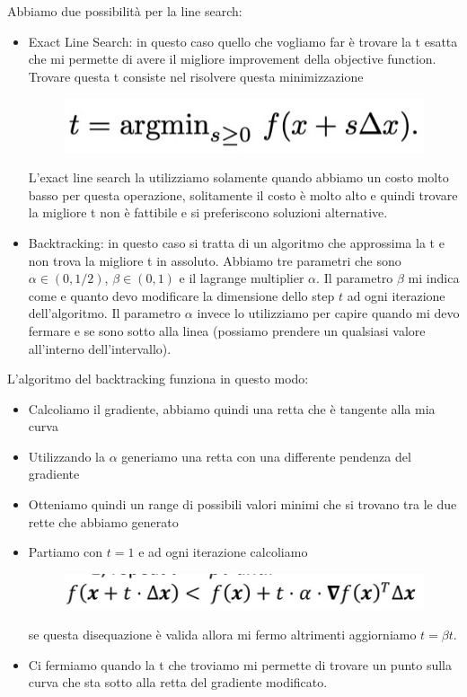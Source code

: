 \documentclass[14pt]{extreport}
\begin{document}
Abbiamo due possibilità per la line search:

\begin{itemize}
\item Exact Line Search: in questo caso quello che vogliamo far è trovare la t esatta che mi permette di avere il migliore improvement della objective
function. Trovare questa t consiste nel risolvere questa minimizzazione \begin{figure}[H]
\centering
\includegraphics[width=0.4\linewidth]{241.jpeg}
\end{figure}
L'exact line search la utilizziamo solamente quando abbiamo un costo molto basso per questa operazione, solitamente il costo è molto alto e quindi
trovare la migliore t non è fattibile e si preferiscono soluzioni alternative.
\item Backtracking: in questo caso si tratta di un algoritmo che approssima la t e non trova la migliore t in assoluto. Abbiamo tre parametri che sono
$\alpha \in (0,1/2)$, $\beta \in (0,1)$ e il lagrange multiplier $\alpha$. Il parametro $\beta$ mi indica come e quanto devo modificare la dimensione
dello step $t$ ad ogni iterazione dell'algoritmo. Il parametro $\alpha$ invece lo utilizziamo per capire quando mi devo fermare e se sono sotto alla
linea (possiamo prendere un qualsiasi valore all'interno dell'intervallo).
\end{itemize}

L'algoritmo del backtracking funziona in questo modo:
\begin{itemize}
\item Calcoliamo il gradiente, abbiamo quindi una retta che è tangente alla mia curva
\item Utilizzando la $\alpha$ generiamo una retta con una differente pendenza del gradiente
\item Otteniamo quindi un range di possibili valori minimi che si trovano tra le due rette che abbiamo generato
\item Partiamo con $t=1$ e ad ogni iterazione calcoliamo \begin{figure}[H]
\centering
\includegraphics[width=0.7\linewidth]{242.jpeg}
\end{figure} se questa disequazione è valida allora mi fermo altrimenti aggiorniamo $t=\beta t$.
\item Ci fermiamo quando la t che troviamo mi permette di trovare un punto sulla curva che sta sotto alla retta del gradiente modificato.
\end{itemize}
\end{document}
